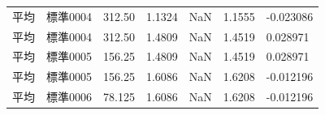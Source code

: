 \documentclass[UTF8,10pt,a4paper,fontset=fandol]{ctexart}
\newcommand{\fieldvalue}[1]{#1}
\begin{document}
\begin{center}
\begin{center}
\begin{tabularx}{\textwidth}{l l l l l l l}
平均 &
\fieldvalue{標準0004} &
\fieldvalue{312.50} &
\fieldvalue{1.1324} &
\fieldvalue{NaN} &
\fieldvalue{1.1555} &
\fieldvalue{-0.023086} \\

平均 &
\fieldvalue{標準0004} &
\fieldvalue{312.50} &
\fieldvalue{1.4809} &
\fieldvalue{NaN} &
\fieldvalue{1.4519} &
\fieldvalue{0.028971} \\

平均 &
\fieldvalue{標準0005} &
\fieldvalue{156.25} &
\fieldvalue{1.4809} &
\fieldvalue{NaN} &
\fieldvalue{1.4519} &
\fieldvalue{0.028971} \\

平均 &
\fieldvalue{標準0005} &
\fieldvalue{156.25} &
\fieldvalue{1.6086} &
\fieldvalue{NaN} &
\fieldvalue{1.6208} &
\fieldvalue{-0.012196} \\

平均 &
\fieldvalue{標準0006} &
\fieldvalue{78.125} &
\fieldvalue{1.6086} &
\fieldvalue{NaN} &
\fieldvalue{1.6208} &
\fieldvalue{-0.012196} \\


\end{tabularx}
\end{center}
\end{center}
\end{document}
